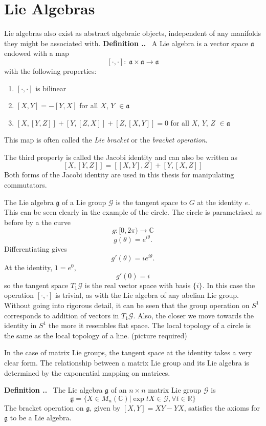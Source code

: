 \documentclass[honours]{UNSWthesis}
\newcommand{\R}{\mathbb{R}}
\newcommand{\C}{\mathbb{C}}
\newcommand{\G}{\mathcal{G}}
\newcommand{\g}{\mathfrak{g}}
\newcommand{\1}{\mathbf{e}_{1}}
\newcommand{\2}{\mathbf{e}_{3}}
\newcommand{\3}{\mathbf{e}_{3}}
\newcounter{Item}[section]
\newenvironment{Definition}{\medskip
                            \refstepcounter{Item}
                            \noindent
                           {\bf Definition \thesection.\theItem.}\ }
                           {\medskip}
\begin{document}
\section{Lie Algebras}
Lie algebras also exist as abstract algebraic objects, independent of any manifolds they might be associated with.
\begin{Definition}\label{Lie Algebra}
A Lie algebra is a vector space $\mathfrak{a}$ endowed with a map
\[ [\cdotp,\cdotp]:\; \mathfrak{a} \times \mathfrak{a} \longrightarrow \mathfrak{a} \]
with the following properties:
\begin{enumerate}
 \item $[\cdotp, \cdotp]$ is bilinear
 \item $[X,Y]=-[Y,X]$ for all $X$, $Y$ $\in \mathfrak{a}$
 \item $[X,[Y,Z]]+[Y,[Z,X]]+[Z,[X,Y]]=0$ for all $X$, $Y$, $Z$ $\in \mathfrak{a}$
\end{enumerate}
This map is often called the \emph{Lie bracket} or the \emph{bracket operation}.

The third property is called the Jacobi identity and can also be written as
\[
[X,[Y,Z]]=[[X,Y],Z]+[Y,[X,Z]]
\]
Both forms of the Jacobi identity are used in this thesis for manipulating commutators.
\end{Definition}


The Lie algebra $\g$ of a Lie group $\G$ is the tangent space to $G$ at the identity $e$. This can be seen clearly in 
the example of the circle. The circle is parametrised as before by a the curve
\[ g: [0,2\pi) \longrightarrow \C \]
\[ g(\theta)= e^{i\theta}.\]
Differentiating gives
\[g' (\theta)= ie^{i\theta}.\]
At the identity, $1=e^{0}$,
\[ g' (0) = i \]
so the tangent space $T_{1}\G$ is the real vector space with basis $\{i\}$. 
In this case the operation $[\cdotp, \cdotp]$ is trivial, as with the Lie algebra of any abelian Lie group.
Without going into rigorous detail, it can be seen that the group operation on $S^{1}$ corresponds to addition of 
vectors in $T_{1}\G$. Also, the closer we move towards the identity in $S^{1}$ the more it resembles flat space. The local topology of a circle is the same as the local topology of a line.
(picture required)

In the case of matrix Lie groups, the tangent space at the identity takes a very clear form. The relationship between a 
matrix Lie group and its Lie algebra is determined by the exponential mapping on matrices. 

\begin{Definition}\label{Lie Algebra of a Matrix Lie Group}
The Lie algebra $\g$ of an $n \times n$ matrix Lie group $\G$ is
\[
\g = \{ X \in M_{n}(\C) \big| \exp{tX} \in \G , \forall t \in \R \}
\]
The bracket operation on $\g$, given by $[X,Y]=XY-YX$, satisfies the axioms for $\g$ to be a Lie algebra. 
\end{Definition}
\end{document}
